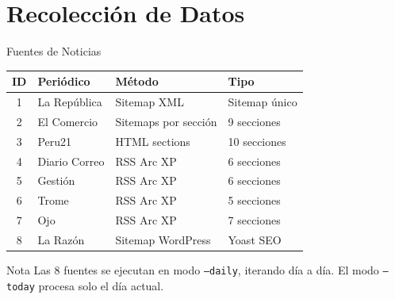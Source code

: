 \documentclass[11pt,aspectratio=169,spanish]{beamer}
\begin{document}
\section{Recolección de Datos}

\begin{frame}{Fuentes de Noticias}
    \begin{table}[h]
    \centering
    \small
    \begin{tabular}{clll}
        \toprule
        \textbf{ID} & \textbf{Periódico} & \textbf{Método} & \textbf{Tipo} \\
        \midrule
        1 & La República & Sitemap XML & Sitemap único \\
        2 & El Comercio & Sitemaps por sección & 9 secciones \\
        3 & Peru21 & HTML sections & 10 secciones \\
        4 & Diario Correo & RSS Arc XP & 6 secciones \\
        5 & Gestión & RSS Arc XP & 6 secciones \\
        6 & Trome & RSS Arc XP & 5 secciones \\
        7 & Ojo & RSS Arc XP & 7 secciones \\
        8 & La Razón & Sitemap WordPress & Yoast SEO \\
        \bottomrule
    \end{tabular}
    \end{table}

    \begin{alertblock}{Nota}
        Las 8 fuentes se ejecutan en modo \texttt{--daily}, iterando día a día.
        El modo \texttt{--today} procesa solo el día actual.
    \end{alertblock}
\end{frame}
\end{document}

